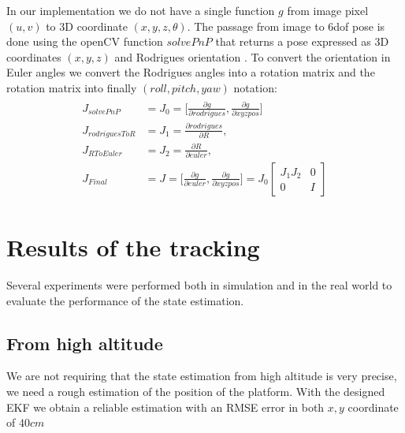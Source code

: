 In our implementation we do not have a single function $g$ from image pixel $(u,v)$ to 3D coordinate $(x,y,z,\theta)$. The passage from image to 6dof pose is done using the openCV function $solvePnP$ \cite{opencv_library} that returns a pose expressed as 3D coordinates $(x,y,z)$ and Rodrigues orientation  \cite{belongie1999rodrigues}. To convert the orientation in Euler angles we convert the Rodrigues angles into a rotation matrix and the rotation matrix into finally $(roll,pitch,yaw)$ notation:
\begin{align}
\begin{split}
J_{solvePnP} &= J_0 = \Big[ \frac  {\partial g}{\partial rodrigues},  \frac {\partial g}{\partial xyzpos} \Big] \\
J_{rodriguesToR} &= J_1 =  \frac  {\partial rodrigues}{\partial R}, \\
J_{RToEuler} &= J_2 =  \frac  {\partial R}{\partial euler}, \\
J_{Final} &= J = \Big[ \frac  {\partial g}{\partial euler},  \frac {\partial g}{\partial xyzpos} \Big]  = J_{0}{\begin{bmatrix}
J_{1}J_{2} & 0 \\[10pt]
0 & I 
\end{bmatrix}}
\end{split}
\end{align}
 

\section{Results of the tracking}
Several experiments were performed both in simulation and in the real world to evaluate the performance of the state estimation.
\subsection{From high altitude}
We are not requiring that the state estimation from high altitude is very precise, we need a rough estimation of the position of the platform. With the designed  EKF we obtain a reliable estimation with an RMSE error in both $x,y$ coordinate of $40cm$

